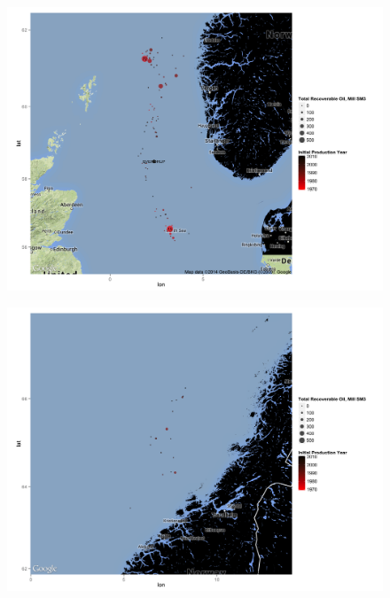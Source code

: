 \documentclass{beamer}
\begin{document}
\begin{frame}[plain]
	\begin{figure}
	\includegraphics[width=.8\textwidth]{figures/north_sea_reserves.png}	
	\label{north_sea_reserves}
	\end{figure}
\end{frame}


\begin{frame}[plain]
	\begin{figure}
	\includegraphics[width=.8\textwidth]{figures/norwegian_sea_reserves.png}
	
	\label{norwegian_sea_reserves}
	\end{figure}
\end{frame}
\end{document}
